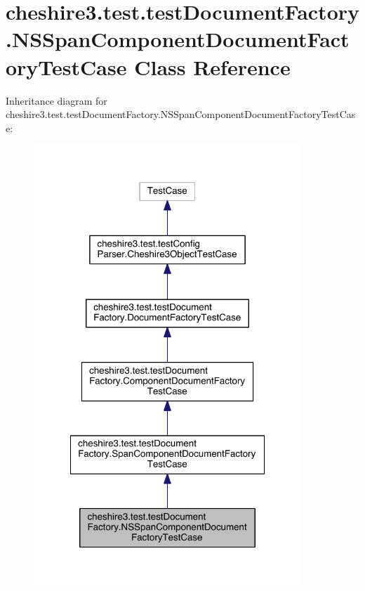 \hypertarget{classcheshire3_1_1test_1_1test_document_factory_1_1_n_s_span_component_document_factory_test_case}{\section{cheshire3.\-test.\-test\-Document\-Factory.\-N\-S\-Span\-Component\-Document\-Factory\-Test\-Case Class Reference}
\label{classcheshire3_1_1test_1_1test_document_factory_1_1_n_s_span_component_document_factory_test_case}
}


Inheritance diagram for cheshire3.\-test.\-test\-Document\-Factory.\-N\-S\-Span\-Component\-Document\-Factory\-Test\-Case\-:
\nopagebreak
\begin{figure}[H]
\begin{center}
\leavevmode
\includegraphics[width=286pt]{classcheshire3_1_1test_1_1test_document_factory_1_1_n_s_span_component_document_factory_test_case__inherit__graph}
\end{center}
\end{figure}


